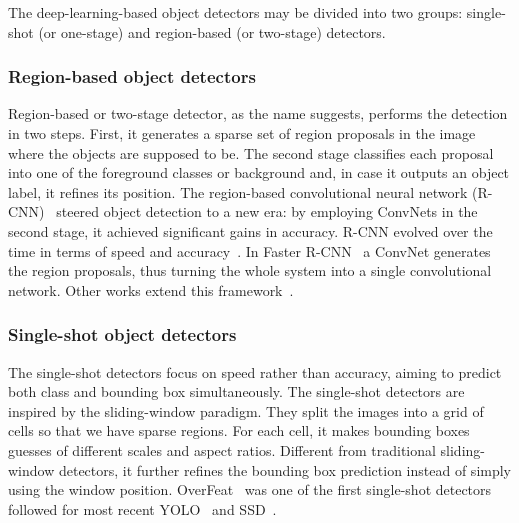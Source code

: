 %
The deep-learning-based object detectors may be divided into two groups: single-shot (or one-stage) and region-based (or two-stage) detectors.

\subsubsection{Region-based object detectors}
%
Region-based or two-stage detector, as the name suggests, performs the detection in two steps.
First, it generates a sparse set of region proposals in the image where the objects are supposed to be.
The second stage classifies each proposal into one of the foreground classes or background and, in case it outputs an object label, it refines its position.
The region-based convolutional neural network (R-CNN)~\cite{Girshick2016RCNN}
steered object detection to a new era:
by employing ConvNets in the second stage, it achieved significant gains in accuracy.
R-CNN evolved over the time in terms of speed and accuracy~\cite{Girshick2015, Ren2017fasterpami}.
In Faster R-CNN~\cite{Ren2017fasterpami} a ConvNet generates the region proposals, thus turning the whole system into a single convolutional network.
Other works extend this framework~\cite{Dai2016, He2017mask}.

\subsubsection{Single-shot object detectors}
%
The single-shot detectors focus on speed rather than accuracy,
aiming to predict both class and bounding box simultaneously.
The single-shot detectors are inspired by the sliding-window paradigm.
They split the images into a grid of cells so that we have sparse regions. For each cell, it makes bounding boxes guesses of different scales and aspect ratios.
Different from traditional sliding-window detectors, it further refines the bounding box prediction instead of simply using the window position.
OverFeat~\cite{Sermanet2014} was one of the first single-shot detectors followed for most recent YOLO~\cite{Redmon2016} and SSD~\cite{Liu2016}.


